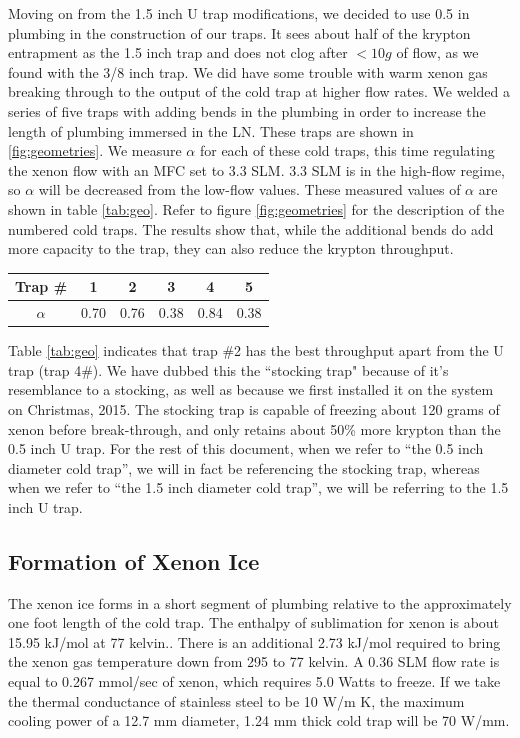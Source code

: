 \documentclass[12pt]{article}
\begin{document}
Moving on from the 1.5 inch U trap modifications, we decided to use 0.5 in plumbing in the construction of our traps. It sees about half of the krypton entrapment as the 1.5 inch trap and does not clog after $<10g$ of flow, as we found with the 3/8 inch trap. We did have some trouble with warm xenon gas breaking through to the output of the cold trap at higher flow rates. We welded a series of five traps with adding bends in the plumbing in order to increase the length of plumbing immersed in the LN. These traps are shown in \ref{fig:geometries}. We measure $\alpha$ for each of these cold traps, this time regulating the xenon flow with an MFC set to 3.3 SLM. 3.3 SLM is in the high-flow regime, so $\alpha$ will be decreased from the low-flow values. These measured values of $\alpha$ are shown in table \ref{tab:geo}. Refer to figure \ref{fig:geometries} for the description of the numbered cold traps. The results show that, while the additional bends do add more capacity to the trap, they can also reduce the krypton throughput.
\begin{center}
 \label{tab:geo}
 \begin{tabular}{c || c c c c c}
 \hline
 \hline
 Trap \# & 1 & 2 & 3 & 4 & 5 \\ [0.5ex] 
 \hline\hline
 $\alpha$ & 0.70 & 0.76 & 0.38 & 0.84 & 0.38 \\ [1ex] 
\hline
\end{tabular}
\end{center}

Table \ref{tab:geo} indicates that trap \#2 has the best throughput apart from the U trap (trap 4\#). We have dubbed this the ``stocking trap" because of it's resemblance to a stocking, as well as because we first installed it on the system on Christmas, 2015. The stocking trap is capable of freezing about 120 grams of xenon before break-through, and only retains about 50\% more krypton than the 0.5 inch U trap. For the rest of this document, when we refer to ``the 0.5 inch diameter cold trap'', we will in fact be referencing the stocking trap, whereas when we refer to ``the 1.5 inch diameter cold trap'', we will be referring to the 1.5 inch U trap.


\subsection{Formation of Xenon Ice}
The xenon ice forms in a short segment of plumbing relative to the approximately one foot length of the cold trap. The enthalpy of sublimation for xenon is about 15.95 kJ/mol at 77 kelvin.\cite{vaporpressure}. There is an additional 2.73 kJ/mol required to bring the xenon gas temperature down from 295 to 77 kelvin. A 0.36 SLM flow rate is equal to 0.267 mmol/sec of xenon, which requires 5.0 Watts to freeze. If we take the thermal conductance of stainless steel to be 10 W/m K, the maximum cooling power of a 12.7 mm diameter, 1.24 mm thick cold trap will be 70 W/mm. 
\end{document}
